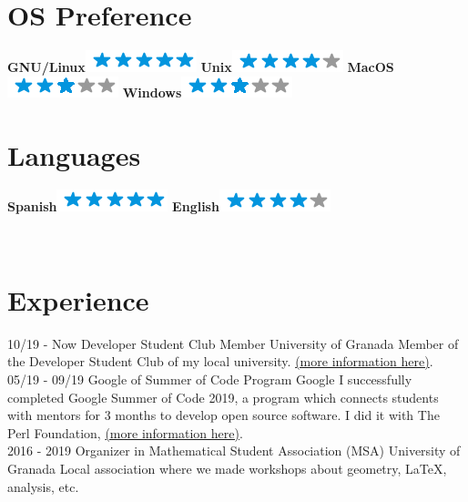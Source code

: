 \documentclass[]{friggeri-cv}
\begin{document}
\begin{aside}
  \section{OS Preference}
    \textbf{GNU/Linux}\includegraphics[scale=0.40]{img/5stars.png}
    \textbf{Unix}\includegraphics[scale=0.40]{img/4stars.png}
    \textbf{MacOS}\includegraphics[scale=0.40]{img/3stars.png}
    \textbf{Windows}\includegraphics[scale=0.40]{img/3stars.png}
    ~
  \section{Languages}
    \textbf{Spanish}\includegraphics[scale=0.40]{img/5stars.png}
    \textbf{English}\includegraphics[scale=0.40]{img/4stars.png}
    ~
\end{aside}
~
\section{Experience}
\begin{entrylist}
  \entry
    {10/19 - Now}
    {Developer Student Club Member}
    {University of Granada}
    {Member of the Developer Student Club of my local university. \href{https://github.com/Developer-Student-Clubs-UGR}{(more information here)}.\\}
  \entry
    {05/19 - 09/19}
    {Google of Summer of Code Program}
    {Google}
    {I successfully completed Google Summer of Code 2019, a program which connects students with mentors for 3 months to develop open source software. I did it with The Perl Foundation, \href{https://summerofcode.withgoogle.com/projects/4930522189398016}{(more information here)}.\\}
  \entry    
    {2016 - 2019}
    {Organizer in Mathematical Student Association (MSA)}
    {University of Granada}
    {Local association where we made workshops about geometry, \LaTeX, analysis, etc.\\}
\end{entrylist}
\end{document}
